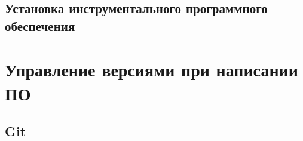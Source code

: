 

\section{Установка инструментального программного обеспечения}





\chapter{Управление версиями при написании ПО}

\section{Git}\label{git}\cite{progit}
